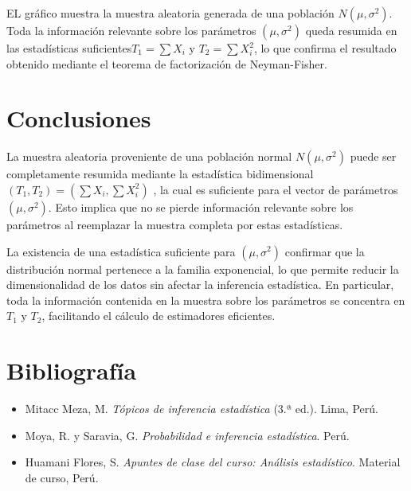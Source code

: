 \documentclass[
  11pt,
]{report}
\providecommand{\tightlist}{%
  \setlength{\itemsep}{0pt}\setlength{\parskip}{0pt}}
\begin{document}
EL gráfico muestra la muestra aleatoria generada de una población
\(N(\mu,\sigma^2)\). Toda la información relevante sobre los parámetros
\((\mu,\sigma^2)\) queda resumida en las estadísticas
suficientes\(T_1 = \sum X_i \text{ y } T_2 = \sum X_i^2\), lo que
confirma el resultado obtenido mediante el teorema de factorización de
Neyman-Fisher.

\section{Conclusiones}\label{conclusiones}

La muestra aleatoria proveniente de una población normal
\(N(\mu,\sigma^2)\) puede ser completamente resumida mediante la
estadística bidimensional \((T_1,T_2)=\left(\sum X_i,\sum X_i^2\right)\)
, la cual es suficiente para el vector de parámetros \((\mu,\sigma^2)\).
Esto implica que no se pierde información relevante sobre los parámetros
al reemplazar la muestra completa por estas estadísticas.

La existencia de una estadística suficiente para \((\mu,\sigma^2)\)
confirmar que la distribución normal pertenece a la familia exponencial,
lo que permite reducir la dimensionalidad de los datos sin afectar la
inferencia estadística. En particular, toda la información contenida en
la muestra sobre los parámetros se concentra en \(T_1 \text{ y } T_2\),
facilitando el cálculo de estimadores eficientes.

\section{Bibliografía}\label{bibliografuxeda}

\begin{itemize}
\tightlist
\item
  Mitacc Meza, M. \emph{Tópicos de inferencia estadística} (3.ª ed.).
  Lima, Perú.
\end{itemize}

\begin{itemize}
\tightlist
\item
  Moya, R. y Saravia, G. \emph{Probabilidad e inferencia estadística}.
  Perú.
\end{itemize}

\begin{itemize}
\tightlist
\item
  Huamani Flores, S. \emph{Apuntes de clase del curso: Análisis
  estadístico}. Material de curso, Perú.
\end{itemize}
\end{document}
